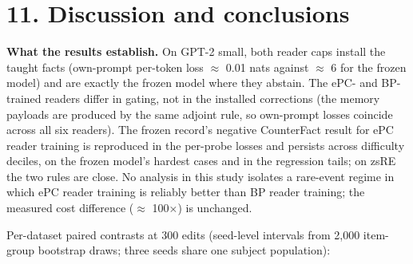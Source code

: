 \documentclass[10pt,a4paper]{article}
\begin{document}
\section*{11. Discussion and conclusions}



\textbf{What the results establish.} On GPT-2 small, both reader caps install the taught facts (own-prompt per-token loss $\approx$ 0.01 nats against $\approx$ 6 for the frozen model) and are exactly the frozen model where they abstain. The ePC- and BP-trained readers differ in gating, not in the installed corrections (the memory payloads are produced by the same adjoint rule, so own-prompt losses coincide across all six readers). The frozen record's negative CounterFact result for ePC reader training is reproduced in the per-probe losses and persists across difficulty deciles, on the frozen model's hardest cases and in the regression tails; on zsRE the two rules are close. No analysis in this study isolates a rare-event regime in which ePC reader training is reliably better than BP reader training; the measured cost difference ($\approx$ 100$\times$) is unchanged.



Per-dataset paired contrasts at 300 edits (seed-level intervals from 2,000 item-group bootstrap draws; three seeds share one subject population):
\end{document}
